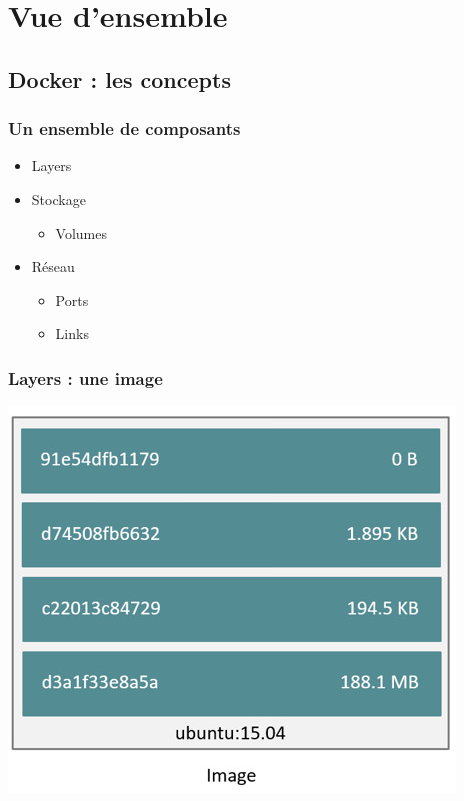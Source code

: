   \section[Docker]{Vue d'ensemble}

  \subsection[Docker]{Docker : les concepts}

  \begin{frame}
    \frametitle{Un ensemble de composants}
    \begin{itemize}
      \item Layers
      \item Stockage
      \begin{itemize}
          \item Volumes \pause
      \end{itemize}
      \item Réseau
      \begin{itemize}
          \item Ports \pause
          \item Links \pause
      \end{itemize}
    \end{itemize}
  \end{frame}

  \begin{frame}
    \frametitle{Layers : une image}
    \includegraphics[width=\linewidth,height=\textheight]{images/docker/image-layers.jpg}
  \end{frame}

